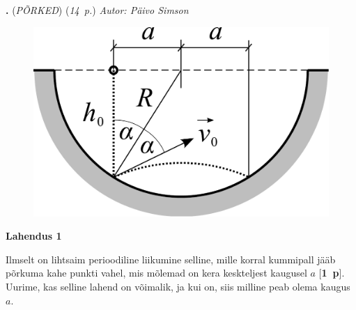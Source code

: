 \documentclass[11pt,a5paper]{article}
\newcommand{\numb}[1]{\vspace{5pt}\textbf{\large #1}}
\newcommand{\nimi}[1]{(\textsl{\small #1})}
\newcommand{\punktid}[1]{(\emph{#1~p.})}
\newcommand{\p}[1]{[\textbf{#1~p}]}
\newcounter{ylesanne}
\newcommand{\yl}[1]{\addtocounter{ylesanne}{1}\numb{\theylesanne.} \nimi{#1} \newblock{}}
\newcommand{\autor}[1]{\emph{Autor: #1}}%
\begin{document}
\yl{PÕRKED}
\punktid{14} \autor{Päivo Simson}

\begin{figure}
\vspace{-1.1cm}
  \begin{center}
    \includegraphics[width=1\linewidth]{porked_sol.pdf}
  \end{center}
  \vspace{-1cm}
\end{figure}

\textbf{Lahendus 1}

Ilmselt on lihtsaim perioodiline liikumine selline, mille korral kummipall jääb põrkuma kahe punkti vahel, mis mõlemad on kera keskteljest kaugusel $a$ \p{1}. Uurime, kas selline lahend on võimalik, ja kui on, siis milline peab olema kaugus $a$. 
\end{document}
